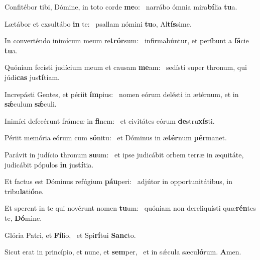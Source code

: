 \item Confitébor tibi, Dómine, in toto corde \textbf{me}o:~\psstar{} narrábo ómnia mira\textbf{bí}lia \textbf{tu}a.
\item Lætábor et exsultábo \textbf{in} te:~\psstar{} psallam nómini \textbf{tu}o, Al\textbf{tís}sime.
\item In converténdo inimícum meum re\textbf{trór}sum:~\psstar{} infirmabúntur, et períbunt a \textbf{fá}cie \textbf{tu}a.
\item Quóniam fecísti judícium meum et causam \textbf{me}am:~\psstar{} sedísti super thronum, qui júdi\textbf{cas} jus\textbf{tí}tiam.
\item Increpásti Gentes, et périit \textbf{ím}pius:~\psstar{} nomen eórum delésti in ætérnum, et in \textbf{sǽ}culum \textbf{sǽ}culi.
\item Inimíci defecérunt frámeæ in \textbf{fi}nem:~\psstar{} et civitátes eórum \textbf{de}stru\textbf{xís}ti.
\item Périit memória eórum cum \textbf{só}nitu:~\psstar{} et Dóminus in æ\textbf{tér}num \textbf{pér}manet.
\item Parávit in judício thronum \textbf{su}um:~\psstar{} et ipse judicábit orbem terræ in æquitáte, judicábit pópulos \textbf{in} jus\textbf{tí}tia.
\item Et factus est Dóminus refúgium \textbf{páu}peri:~\psstar{} adjútor in opportunitátibus, in tribu\textbf{la}ti\textbf{ó}ne.
\item Et sperent in te qui novérunt nomen \textbf{tu}um:~\psstar{} quóniam non dereliquísti quæ\textbf{rén}tes te, \textbf{Dó}mine.
\item Glória Patri, et \textbf{Fí}lio,~\psstar{} et Spi\textbf{rí}tui \textbf{Sanc}to.
\item Sicut erat in princípio, et nunc, et \textbf{sem}per,~\psstar{} et in sǽcula sæcu\textbf{ló}rum. \textbf{A}men.
